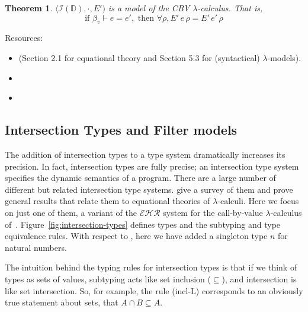 \documentclass{tufte-handout}
\newtheorem{theorem}{Theorem}%
\begin{document}
\begin{theorem}
$\langle \mathcal{I}(\mathbb{D}), \cdot, E')$ is a model of the CBV
  $\lambda$-calculus. That is, 
  \[
  \text{if } \beta_v \vdash e = e', 
  \text{ then } \forall \rho, E'\,e\,\rho = E'\,e'\,\rho
  \]
\end{theorem}


Resources:
\begin{itemize}
\item \citet{barendregt84:_lambda_calculus} (Section 2.1 for
  equational theory and Section 5.3 for (syntactical) $\lambda$-models).
\item \citet{Alessi:2006aa}
\item \citet{Hindley:1980aa}
\end{itemize}


\subsection{Intersection Types and Filter models}
\label{sec:filter-models}

\newcommand{\UP}[1]{\mathop{\uparrow}\! #1}


The addition of intersection types to a type system dramatically
increases its precision. In fact, intersection types are fully
precise; an intersection type system specifies the dynamic semantics
of a program.
%
There are a large number of different but related intersection type
systems. \citet{Alessi:2006aa} give a survey of them and prove general
results that relate them to equational theories of
$\lambda$-calculi. Here we focus on just one of them, a variant of the
$\mathcal{EHR}$ system for the call-by-value $\lambda$-calculus
of~\citet{Egidi:1992aa}. Figure~\ref{fig:intersection-types} defines
types and the subtyping and type equivalence rules.  With respect to
\citet{Egidi:1992aa}, here we have added a singleton type $n$ for
natural numbers. 

The intuition behind the typing rules for intersection types is that
if we think of types as sets of values, subtyping acts like set
inclusion ($\subseteq$), and intersection is like set
intersection. So, for example, the rule (incl-L) corresponds to an
obviously true statement about sets, that $A \cap B \subseteq A$.
\end{document}
